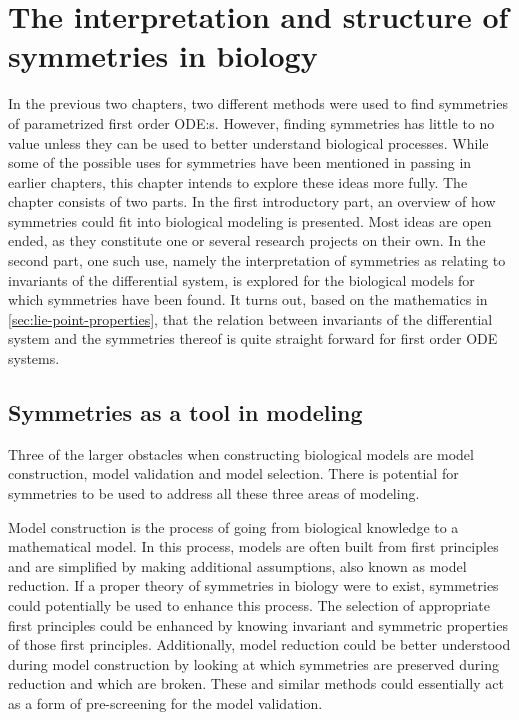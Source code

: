 \chapter{The interpretation and structure of symmetries in biology}\label{ch:uses}

In the previous two chapters, two different methods were used to find symmetries of parametrized first order ODE:s.
However, finding symmetries has little to no value unless they can be used to better understand biological processes.
While some of the possible uses for symmetries have been mentioned in passing in earlier chapters, this chapter intends to explore these ideas more fully.
The chapter consists of two parts.
In the first introductory part, an overview of how symmetries could fit into biological modeling is presented.
Most ideas are open ended, as they constitute one or several research projects on their own.
In the second part, one such use, namely the interpretation of symmetries as relating to invariants of the differential system, is explored for the biological models for which symmetries have been found.
It turns out, based on the mathematics in \cref{sec:lie-point-properties}, that the relation between invariants of the differential system and the symmetries thereof is quite straight forward for first order ODE systems.

\section{Symmetries as a tool in modeling} \label{sec:symmetries-as-tool}

Three of the larger obstacles when constructing biological models are model construction, model validation and model selection.
There is potential for symmetries to be used to address all these three areas of modeling.

Model construction is the process of going from biological knowledge to a mathematical model.
In this process, models are often built from first principles and are simplified by making additional assumptions, also known as model reduction.
If a proper theory of symmetries in biology were to exist, symmetries could potentially be used to enhance this process.
The selection of appropriate first principles could be enhanced by knowing invariant and symmetric properties of those first principles.
Additionally, model reduction could be better understood during model construction by looking at which symmetries are preserved during reduction and which are broken.
These and similar methods could essentially act as a form of pre-screening for the model validation.

